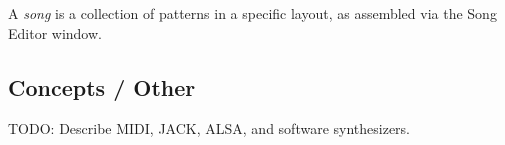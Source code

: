    A \textsl{song} is a collection of patterns in a specific layout, as
   assembled via the Song Editor window.

\subsection{Concepts / Other}
\label{subsec:concepts_other}

TODO: Describe MIDI, JACK, ALSA, and software synthesizers.

